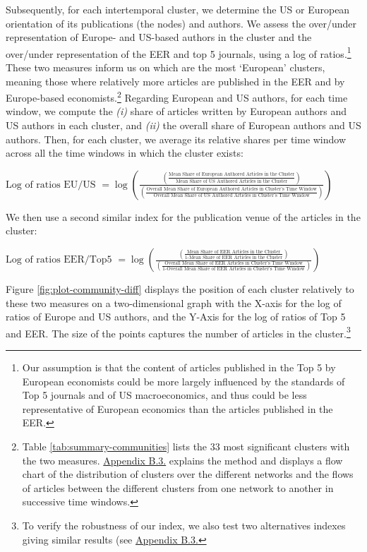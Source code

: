 \documentclass[
  12pt,
  onecolumn]{article}
\begin{document}
Subsequently, for each intertemporal cluster, we determine the US or European orientation of its publications (the nodes) and authors. We assess the over/under representation of Europe- and US-based authors in the cluster and the over/under representation of the EER and top 5 journals, using a log of ratios.\footnote{Our assumption is that the content of articles published in the Top 5 by European economists could be more largely influenced by the standards of Top 5 journals and of US macroeconomics, and thus could be less representative of European economics than the articles published in the EER.} These two measures inform us on which are the most `European' clusters, meaning those where relatively more articles are published in the EER and by Europe-based economists.\footnote{Table \ref{tab:summary-communities} lists the 33 most significant clusters with the two measures. \protect\hyperlink{network}{Appendix B.3.} explains the method and displays a flow chart of the distribution of clusters over the different networks and the flows of articles between the different clusters from one network to another in successive time windows.} Regarding European and US authors, for each time window, we compute the \emph{(i)} share of articles written by European authors and US authors in each cluster, and \emph{(ii)} the overall share of European authors and US authors. Then, for each cluster, we average its relative shares per time window across all the time windows in which the cluster exists:

\bigskip

\({\scriptstyle \text{Log of ratios EU/US }=\log(\frac{(\frac{\text{Mean Share of European Authored Articles in the Cluster}}{\text{Mean Share of US Authored Articles in the Cluster}})} {(\frac{\text{Overall Mean Share of European Authored Articles in Cluster's Time Window}}{\text{Overall Mean Share of US Authored Articles in Cluster's Time Window}})})}\)
\bigskip

We then use a second similar index for the publication venue of the articles in the cluster:

\bigskip

\({\scriptstyle \text{Log of ratios EER/Top5 }=\log(\frac{(\frac{\text{Mean Share of EER Articles in the Cluster}}{\text{1-Mean Share of EER Articles in the Cluster}})} {(\frac{\text{Overall Mean Share of EER Articles in Cluster's Time Window}}{\text{1-Overall Mean Share of EER Articles in Cluster's Time Window}})})}\)
\bigskip

Figure \ref{fig:plot-community-diff} displays the position of each cluster relatively to these two measures on a two-dimensional graph with the X-axis for the log of ratios of Europe and US authors, and the Y-Axis for the log of ratios of Top 5 and EER. The size of the points captures the number of articles in the cluster.\footnote{To verify the robustness of our index, we also test two alternatives indexes giving similar results (see \protect\hyperlink{alt-index}{Appendix B.3.}}
\end{document}
